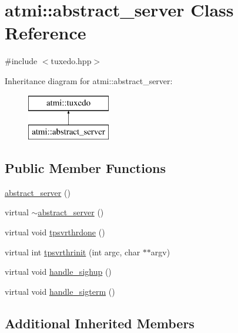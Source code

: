 \hypertarget{classatmi_1_1abstract__server}{\section{atmi\+:\+:abstract\+\_\+server Class Reference}
\label{classatmi_1_1abstract__server}
}


{\ttfamily \#include $<$tuxedo.\+hpp$>$}

Inheritance diagram for atmi\+:\+:abstract\+\_\+server\+:\begin{figure}[H]
\begin{center}
\leavevmode
\includegraphics[height=2.000000cm]{classatmi_1_1abstract__server}
\end{center}
\end{figure}
\subsection*{Public Member Functions}
\begin{DoxyCompactItemize}
\item 
\hyperlink{classatmi_1_1abstract__server_ae8379cb3f00991fa5459f02d106f45de}{abstract\+\_\+server} ()
\item 
virtual \hyperlink{classatmi_1_1abstract__server_a2a69000edc58c8111234060ea0bc330e}{$\sim$abstract\+\_\+server} ()
\item 
virtual void \hyperlink{classatmi_1_1abstract__server_ad839be63bae91afe4b5f4e090cd8e8c5}{tpsvrthrdone} ()
\item 
virtual int \hyperlink{classatmi_1_1abstract__server_a08dec6ac0346262a7364e3f6a9657016}{tpsvrthrinit} (int argc, char $\ast$$\ast$argv)
\item 
virtual void \hyperlink{classatmi_1_1abstract__server_a6ba22ce07e663a18c50e26e0bf3d1c02}{handle\+\_\+sighup} ()
\item 
virtual void \hyperlink{classatmi_1_1abstract__server_adb56df1eb235255585c3719e246bd4f3}{handle\+\_\+sigterm} ()
\end{DoxyCompactItemize}
\subsection*{Additional Inherited Members}


